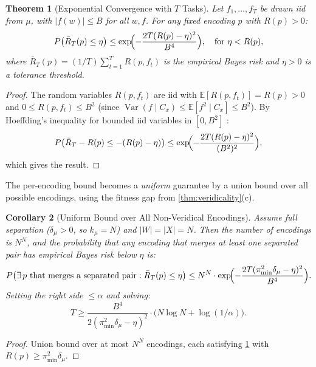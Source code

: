 \documentclass[12pt]{article}
\newtheorem{theorem}{Theorem}[section]
\newtheorem{corollary}[theorem]{Corollary}
\newcommand{\dmu}{\delta_\mu}
\newcommand{\kmu}{k_\mu}
\newcommand{\pimin}{\pi_{\min}}
\newcommand{\Rbar}{\bar{R}}
\newcommand{\E}{\mathbb{E}}
\newcommand{\Var}{\operatorname{Var}}
\begin{document}
\begin{theorem}[Exponential Convergence with $T$ Tasks]\label{thm:concentration}
Let $f_1, \ldots, f_T$ be drawn iid from $\mu$, with $|f(w)| \le B$ for all $w, f$. For any fixed encoding $p$ with $R(p) > 0$:
\begin{equation}\label{eq:hoeffding-risk}
P\bigl(\Rbar_T(p) \le \eta\bigr) \le \exp\!\Bigl(-\frac{2T(R(p) - \eta)^2}{B^4}\Bigr), \quad \text{for } \eta < R(p),
\end{equation}
where $\Rbar_T(p) = (1/T) \sum_{t=1}^{T} R(p, f_t)$ is the empirical Bayes risk and $\eta > 0$ is a tolerance threshold.
\end{theorem}

\begin{proof}
The random variables $R(p, f_t)$ are iid with $\E[R(p, f_t)] = R(p) > 0$ and $0 \le R(p, f_t) \le B^2$ (since $\Var(f \mid C_x) \le \E[f^2 \mid C_x] \le B^2$). By Hoeffding's inequality for bounded iid variables in $[0, B^2]$ \citep{hoeffding_1963}:
\[
P\bigl(\Rbar_T - R(p) \le -(R(p) - \eta)\bigr) \le \exp\!\Bigl(-\frac{2T(R(p) - \eta)^2}{(B^2)^2}\Bigr),
\]
which gives the result.
\end{proof}

The per-encoding bound becomes a \emph{uniform} guarantee by a union bound over all possible encodings, using the fitness gap from \cref{thm:veridicality}(c).

\begin{corollary}[Uniform Bound over All Non-Veridical Encodings]\label{cor:uniform-bound}
Assume full separation ($\dmu > 0$, so $\kmu = N$) and $|W| = |X| = N$. Then the number of encodings is $N^N$, and the probability that any encoding that merges at least one separated pair has empirical Bayes risk below $\eta$ is:
\begin{equation}
P\bigl(\exists\, p \text{ that merges a separated pair}: \Rbar_T(p) \le \eta\bigr) \le N^N \cdot \exp\!\Bigl(-\frac{2T(\pimin^2 \dmu - \eta)^2}{B^4}\Bigr).
\end{equation}
Setting the right side $\le \alpha$ and solving:
\begin{equation}\label{eq:sample-complexity}
T \ge \frac{B^4}{2(\pimin^2 \dmu - \eta)^2} \cdot \bigl(N \log N + \log(1/\alpha)\bigr).
\end{equation}
\end{corollary}

\begin{proof}
Union bound over at most $N^N$ encodings, each satisfying \cref{thm:concentration} with $R(p) \ge \pimin^2 \dmu$.
\end{proof}
\end{document}

